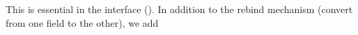 \begin{comment}
		\monitem{Accessing Elements.}
		The function \texttt{setEntry} can be
		used to populate the matrix (from some \texttt{init()} until a
		\texttt{finish()} is emitted).  The function \texttt{setEntry}
		can be costly (for some sparse formats for instance)
%
		Other functions such as {\tt refEntry} (that retrieves a
		writable reference to an entry) may be difficult to implement
		or inefficient (compressed fields, sparse matrices);
		\texttt{getEntry} may be specialized.
		Accessing (read or write) elements, rows or columns through
		iterators, although handy, is not required because it can be
		tricky to implement (compressed fields, hybrid or
		recursive formats). Traits on matrices where efficient iterators
		are available allow for their selections in some algorithms.
\end{comment}
		\begin{comment}
		(\danger We cannot have {\tt const} iterators for all formats
		(see hybrid), walking through a matrix in unspecified order can
		be problematic, for instance, in an hom when a zero may
		alter/change the representation. I don't understand hom more
		than I understand init/rebind by the way, and I won't
		understand it until the morphism is given/chooseable/enforced.
		Rebind is really hom, so why is it in the interface anyway?
		This is the same with getEntry. We don't require it because we
		have a solution. Also, if apply is to be implemented via a
		domain or {\tt mul}, we could stress it is in the interface for
		convenience when writing code only. End of \danger)
		\end{comment}
%
		This is essential in the \applin interface ().
%
		In addition to the rebind mechanism (convert from one field to the other), we add
